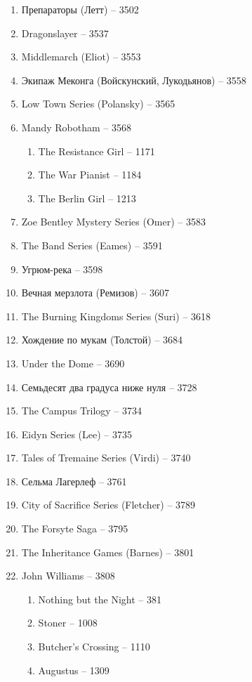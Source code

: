 \documentclass[a4paper, 11pt]{proc} %
\begin{document}
\begin{enumerate}
\begin{enumerate}
        \end{enumerate}
    \item Препараторы (Летт) -- 3502
    \item Dragonslayer -- 3537
    \item Middlemarch (Eliot) -- 3553
    \item Экипаж Меконга (Войскунский, Лукодьянов) -- 3558
    \item Low Town Series (Polansky) -- 3565
    \item Mandy Robotham -- 3568
        \begin{enumerate}
            \item The Resistance Girl -- 1171
            \item The War Pianist -- 1184
            \item The Berlin Girl -- 1213
        \end{enumerate}
    \item Zoe Bentley Mystery Series (Omer) -- 3583
    \item The Band Series (Eames) -- 3591
    \item Угрюм-река -- 3598
    \item Вечная мерзлота (Ремизов) -- 3607
    \item The Burning Kingdoms Series (Suri) -- 3618
    \item Хождение по мукам (Толстой) -- 3684
    \item Under the Dome -- 3690
    \item Семьдесят два градуса ниже нуля -- 3728
    \item The Campus Trilogy -- 3734
    \item Eidyn Series (Lee) -- 3735
    \item Tales of Tremaine Series (Virdi) -- 3740
    \item Сельма Лагерлеф -- 3761
    \item City of Sacrifice Series (Fletcher) -- 3789
    \item The Forsyte Saga -- 3795
    \item The Inheritance Games (Barnes) -- 3801
    \item John Williams -- 3808
        \begin{enumerate}
            \item Nothing but the Night -- 381
            \item Stoner -- 1008
            \item Butcher's Crossing -- 1110
            \item Augustus -- 1309

\end{enumerate}
\end{enumerate}
\end{document}
